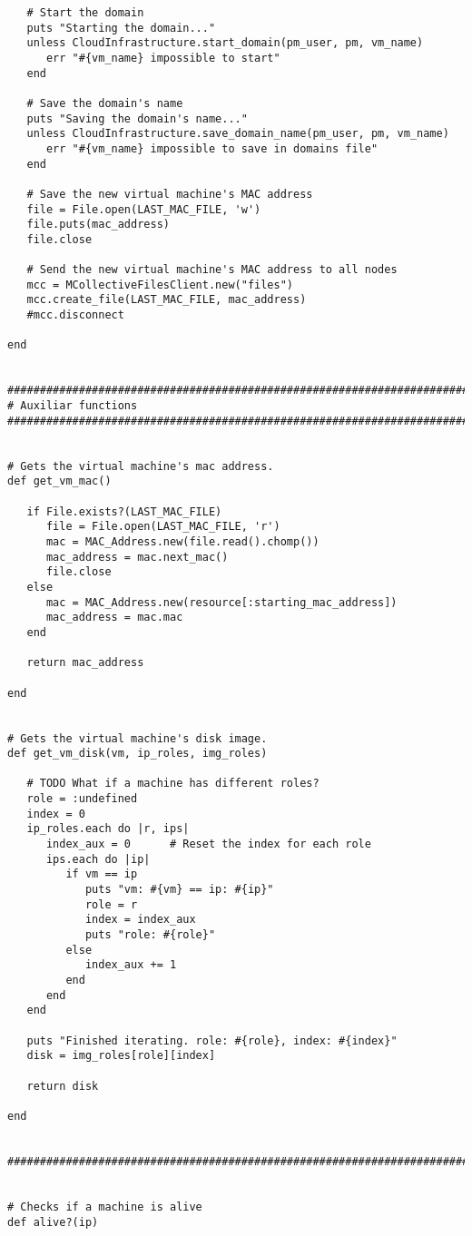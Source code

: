 \begin{lstlisting}
   # Start the domain
   puts "Starting the domain..."
   unless CloudInfrastructure.start_domain(pm_user, pm, vm_name)
      err "#{vm_name} impossible to start"
   end
   
   # Save the domain's name
   puts "Saving the domain's name..."
   unless CloudInfrastructure.save_domain_name(pm_user, pm, vm_name)
      err "#{vm_name} impossible to save in domains file"
   end

   # Save the new virtual machine's MAC address
   file = File.open(LAST_MAC_FILE, 'w')
   file.puts(mac_address)
   file.close
   
   # Send the new virtual machine's MAC address to all nodes
   mcc = MCollectiveFilesClient.new("files")
   mcc.create_file(LAST_MAC_FILE, mac_address)
   #mcc.disconnect

end


################################################################################
# Auxiliar functions
################################################################################


# Gets the virtual machine's mac address.
def get_vm_mac()
   
   if File.exists?(LAST_MAC_FILE)
      file = File.open(LAST_MAC_FILE, 'r')
      mac = MAC_Address.new(file.read().chomp())
      mac_address = mac.next_mac()
      file.close
   else
      mac = MAC_Address.new(resource[:starting_mac_address])
      mac_address = mac.mac
   end
   
   return mac_address

end


# Gets the virtual machine's disk image.
def get_vm_disk(vm, ip_roles, img_roles)
   
   # TODO What if a machine has different roles?
   role = :undefined
   index = 0
   ip_roles.each do |r, ips|
      index_aux = 0      # Reset the index for each role
      ips.each do |ip|
         if vm == ip
            puts "vm: #{vm} == ip: #{ip}"
            role = r
            index = index_aux
            puts "role: #{role}"
         else
            index_aux += 1
         end
      end
   end
   
   puts "Finished iterating. role: #{role}, index: #{index}"
   disk = img_roles[role][index]
   
   return disk

end


################################################################################


# Checks if a machine is alive
def alive?(ip)


\end{lstlisting}
